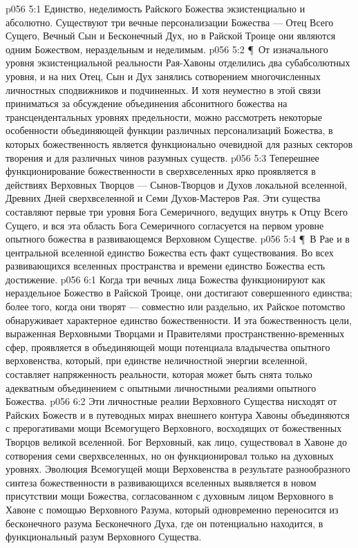 \vs p056 5:1 Единство, неделимость Райского Божества экзистенциально и абсолютно. Существуют три вечные персонализации Божества --- Отец Всего Сущего, Вечный Сын и Бесконечный Дух, но в Райской Троице они  являются одним Божеством, нераздельным и неделимым.
\vs p056 5:2 \P\ От изначального уровня экзистенциальной реальности Рая\hyp{}Хавоны отделились два субабсолютных уровня, и на них Отец, Сын и Дух занялись сотворением многочисленных личностных сподвижников и подчиненных. И хотя неуместно в этой связи приниматься за обсуждение объединения абсонитного божества на трансцендентальных уровнях предельности, можно рассмотреть некоторые особенности объединяющей функции различных персонализаций Божества, в которых божественность является функционально очевидной для разных секторов творения и для различных чинов разумных существ.
\vs p056 5:3 Теперешнее функционирование божественности в сверхвселенных ярко проявляется в действиях Верховных Творцов --- Сынов\hyp{}Творцов и Духов локальной вселенной, Древних Дней сверхвселенной и Семи Духов\hyp{}Мастеров Рая. Эти существа составляют первые три уровня Бога Семеричного, ведущих внутрь к Отцу Всего Сущего, и вся эта область Бога Семеричного согласуется на первом уровне опытного божества в развивающемся Верховном Существе.
\vs p056 5:4 \P\ В Рае и в центральной вселенной единство Божества есть факт существования. Во всех развивающихся вселенных пространства и времени единство Божества есть достижение.
\vs p056 6:1 Когда три вечных лица Божества функционируют как нераздельное Божество в Райской Троице, они достигают совершенного единства; более того, когда они творят --- совместно или раздельно, их Райское потомство обнаруживает характерное единство божественности. И эта божественность цели, выраженная Верховными Творцами и Правителями пространственно\hyp{}временных сфер, проявляется в объединяющей мощи потенциала владычества опытного верховенства, который, при единстве неличностной энергии вселенной, составляет напряженность реальности, которая может быть снята только адекватным объединением с опытными личностными реалиями опытного Божества.
\vs p056 6:2 Эти личностные реалии Верховного Существа нисходят от Райских Божеств и в путеводных мирах внешнего контура Хавоны объединяются с прерогативами мощи Всемогущего Верховного, восходящих от божественных Творцов великой вселенной. Бог Верховный, как лицо, существовал в Хавоне до сотворения семи сверхвселенных, но он функционировал только на духовных уровнях. Эволюция Всемогущей мощи Верховенства в результате разнообразного синтеза божественности в развивающихся вселенных выявляется в новом присутствии мощи Божества, согласованном с духовным лицом Верховного в Хавоне с помощью Верховного Разума, который одновременно переносится из бесконечного разума Бесконечного Духа, где он потенциально находится, в функциональный разум Верховного Существа.
